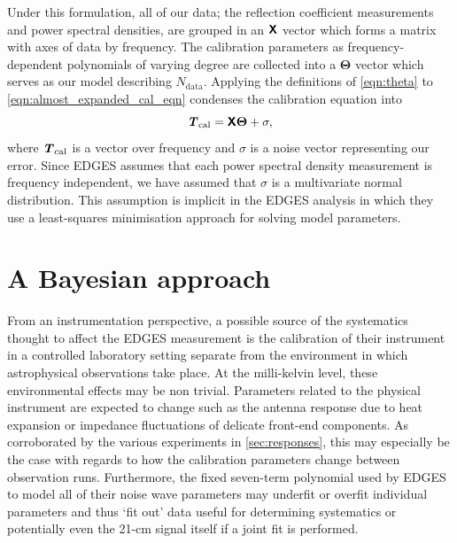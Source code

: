 Under this formulation, all of our data; the reflection coefficient measurements and power spectral densities, are grouped in an $\textbf{\textsf{X}}$ vector which forms a matrix with axes of data by frequency. The calibration parameters as frequency-dependent polynomials of varying degree are collected into a $\boldsymbol{\Theta}$ vector which serves as our model describing $N_{\mathrm{data}}$. Applying the definitions of \cref{eqn:theta} to \cref{eqn:almost_expanded_cal_eqn} condenses the calibration equation into
\begin{equation}\label{eqn:linearmodel}
    \textbf{\textit{T}}_{\mathrm{cal}} = \textbf{\textsf{X}}\boldsymbol{\Theta}+\sigma,
\end{equation}
where $\textbf{\textit{T}}_{\mathrm{cal}}$ is a vector over frequency and $\sigma$ is a noise vector representing our error. Since EDGES assumes that each power spectral density measurement is frequency independent, we have assumed that $\sigma$ is a multivariate normal distribution. This assumption is implicit in the EDGES analysis in which they use a least-squares minimisation approach for solving model parameters.


\section{A Bayesian approach}\label{sec:bayes}
From an instrumentation perspective, a possible source of the systematics thought to affect the EDGES measurement is the calibration of their instrument in a controlled laboratory setting separate from the environment in which astrophysical observations take place. At the milli-kelvin level, these environmental effects may be non trivial. Parameters related to the physical instrument are expected to change such as the antenna response due to heat expansion or impedance fluctuations of delicate front-end components. As corroborated by the various experiments in \cref{sec:responses}, this may especially be the case with regards to how the calibration parameters change between observation runs. Furthermore, the fixed seven-term polynomial used by EDGES to model all of their noise wave parameters may underfit or overfit individual parameters and thus `fit out' data useful for determining systematics or potentially even the 21-cm signal itself if a joint fit is performed.

